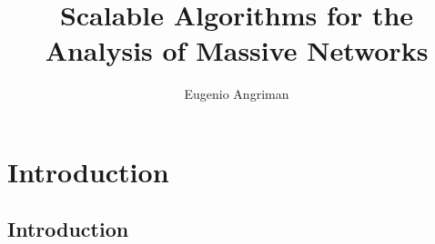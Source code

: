 \documentclass[10pt,titlepage,english,presentation]{beamer}
\title{Scalable Algorithms for the Analysis of Massive Networks}
\author[Eugenio Angriman]{Eugenio Angriman}
\institute{Humboldt-Universit\"at zu Berlin $\cdot$ PhD Defense $\cdot$
14 December 2021}
\begin{document}
\setlength\textheight{7cm} %

\section{Introduction}
\subsection{Introduction}
\begin{frame}
\maketitle
\end{frame}

\end{document}
